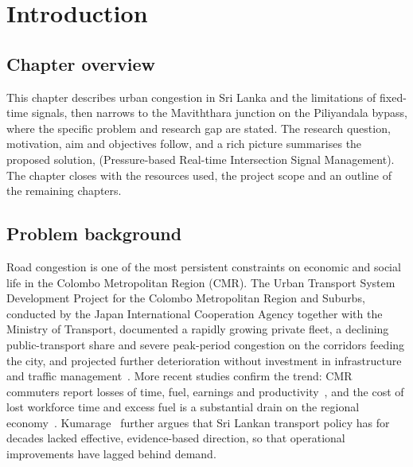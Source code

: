 \chapter{Introduction}\label{ch:intro}

\section{Chapter overview}\label{sec:intro-overview}

This chapter describes urban congestion in Sri Lanka and the limitations of fixed-time signals, then narrows to the Maviththara junction on the Piliyandala bypass, where the specific problem and research gap are stated. The research question, motivation, aim and objectives follow, and a rich picture summarises the proposed solution, \prism{} (Pressure-based Real-time Intersection Signal Management). The chapter closes with the resources used, the project scope and an outline of the remaining chapters.

\section{Problem background}\label{sec:intro-background}

Road congestion is one of the most persistent constraints on economic and social life in the Colombo Metropolitan Region (CMR). The Urban Transport System Development Project for the Colombo Metropolitan Region and Suburbs, conducted by the Japan International Cooperation Agency together with the Ministry of Transport, documented a rapidly growing private fleet, a declining public-transport share and severe peak-period congestion on the corridors feeding the city, and projected further deterioration without investment in infrastructure and traffic management~\cite{jica2014comtrans}. More recent studies confirm the trend: CMR commuters report losses of time, fuel, earnings and productivity~\cite{dammulla2022colombo}, and the cost of lost workforce time and excess fuel is a substantial drain on the regional economy~\cite{jayasooriya2017congestion}. Kumarage~\cite{kumarage2022policy} further argues that Sri Lankan transport policy has for decades lacked effective, evidence-based direction, so that operational improvements have lagged behind demand.

